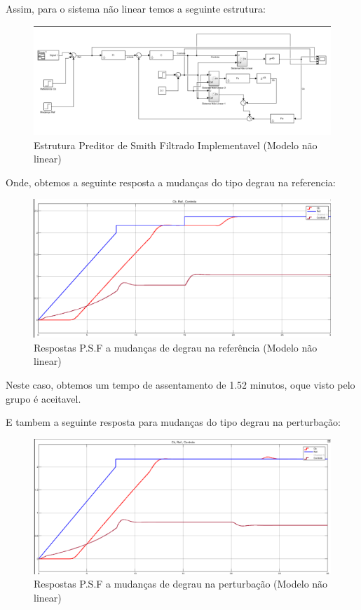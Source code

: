 \documentclass[a4paper,12pt]{article}
\begin{document}
Assim, para o sistema não linear temos a seguinte estrutura:

\begin{figure}[H]
    \centering
    \includegraphics[width=0.9\linewidth]{image6.png}
    \caption{Estrutura Preditor de Smith Filtrado Implementavel (Modelo não linear)}
    \label{fig:enter-label}
\end{figure}

Onde, obtemos a seguinte resposta a mudanças do tipo degrau na referencia:

\begin{figure} [H]
    \centering
    \includegraphics[width=0.9\linewidth]{image7.png}
    \caption{Respostas P.S.F a mudanças de degrau na referência (Modelo não linear)}
    \label{fig:enter-label}
\end{figure}

Neste caso, obtemos um tempo de assentamento de 1.52 minutos, oque visto pelo grupo é aceitavel.

E tambem a seguinte resposta para mudanças do tipo degrau na perturbação:

\begin{figure} [H]
    \centering
    \includegraphics[width=0.9\linewidth]{image8.png}
    \caption{Respostas P.S.F a mudanças de degrau na perturbação (Modelo não linear)}
    \label{fig:enter-label}
\end{figure}
\end{document}
